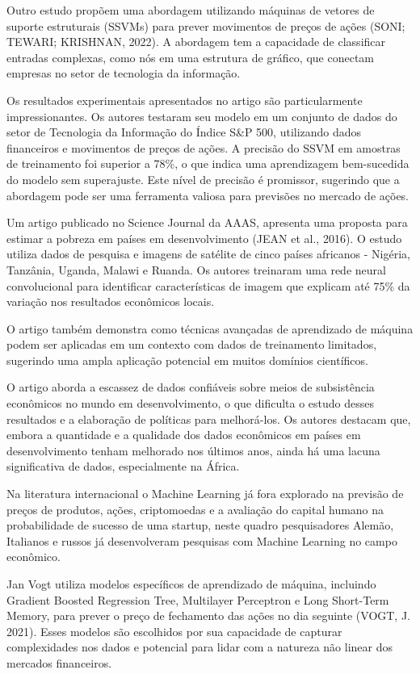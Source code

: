 \documentclass[
]{article}
\begin{document}
Outro estudo propõem uma abordagem utilizando máquinas de vetores de
suporte estruturais (SSVMs) para prever movimentos de preços de ações
(SONI; TEWARI; KRISHNAN, 2022). A abordagem tem a capacidade de
classificar entradas complexas, como nós em uma estrutura de gráfico,
que conectam empresas no setor de tecnologia da informação.

Os resultados experimentais apresentados no artigo são particularmente
impressionantes. Os autores testaram seu modelo em um conjunto de dados
do setor de Tecnologia da Informação do Índice S\&P 500, utilizando
dados financeiros e movimentos de preços de ações. A precisão do SSVM em
amostras de treinamento foi superior a 78\%, o que indica uma
aprendizagem bem-sucedida do modelo sem superajuste. Este nível de
precisão é promissor, sugerindo que a abordagem pode ser uma ferramenta
valiosa para previsões no mercado de ações.

Um artigo publicado no Science Journal da AAAS, apresenta uma proposta
para estimar a pobreza em países em desenvolvimento (JEAN et al., 2016).
O estudo utiliza dados de pesquisa e imagens de satélite de cinco países
africanos - Nigéria, Tanzânia, Uganda, Malawi e Ruanda. Os autores
treinaram uma rede neural convolucional para identificar características
de imagem que explicam até 75\% da variação nos resultados econômicos
locais.

O artigo também demonstra como técnicas avançadas de aprendizado de
máquina podem ser aplicadas em um contexto com dados de treinamento
limitados, sugerindo uma ampla aplicação potencial em muitos domínios
científicos.

O artigo aborda a escassez de dados confiáveis sobre meios de
subsistência econômicos no mundo em desenvolvimento, o que dificulta o
estudo desses resultados e a elaboração de políticas para melhorá-los.
Os autores destacam que, embora a quantidade e a qualidade dos dados
econômicos em países em desenvolvimento tenham melhorado nos últimos
anos, ainda há uma lacuna significativa de dados, especialmente na
África.

Na literatura internacional o Machine Learning já fora explorado na
previsão de preços de produtos, ações, criptomoedas e a avaliação do
capital humano na probabilidade de sucesso de uma startup, neste quadro
pesquisadores Alemão, Italianos e russos já desenvolveram pesquisas com
Machine Learning no campo econômico.

Jan Vogt utiliza modelos específicos de aprendizado de máquina,
incluindo Gradient Boosted Regression Tree, Multilayer Perceptron e Long
Short-Term Memory, para prever o preço de fechamento das ações no dia
seguinte (VOGT, J. 2021). Esses modelos são escolhidos por sua
capacidade de capturar complexidades nos dados e potencial para lidar
com a natureza não linear dos mercados financeiros.
\end{document}

